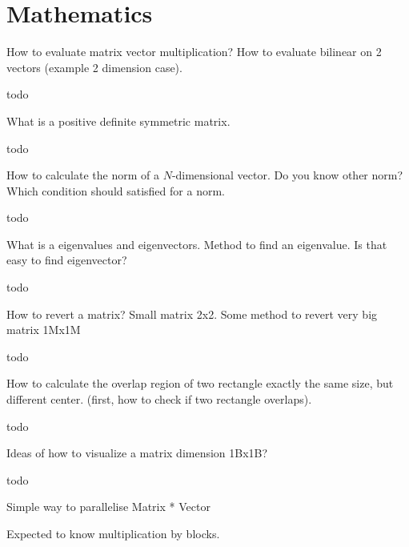 \documentclass{exam}
\begin{document}
\section{Mathematics}
\begin{questions}
\question How to evaluate matrix vector multiplication? How to evaluate bilinear on 2 vectors (example 2 dimension case).
\begin{solution}[.2in]
todo
\end{solution}
	
\question What is a positive definite symmetric matrix.
\begin{solution}[.2in]
	todo
\end{solution}

\question How to calculate the norm of a $N$-dimensional vector. Do you know other norm? Which condition should satisfied for a norm.
\begin{solution}[.2in]
	todo
\end{solution}

\question What is a eigenvalues and eigenvectors. Method to find an eigenvalue. Is that easy to find eigenvector?
\begin{solution}[.2in]
	todo
\end{solution}

\question How to revert a matrix? Small matrix 2x2. Some method to revert very big matrix 1Mx1M
\begin{solution}[.2in]
	todo
\end{solution}

\question How to calculate the overlap region of two rectangle exactly the same size, but different center. (first, how to check if two rectangle overlaps).
\begin{solution}[.2in]
	todo
\end{solution}

\question Ideas of how to visualize a matrix dimension 1Bx1B?
\begin{solution}[.2in]
	todo
\end{solution}

\question Simple way to parallelise Matrix * Vector
\begin{solution}[.2in]
Expected to know multiplication by blocks.
\end{solution}


\end{questions}
\end{document}

